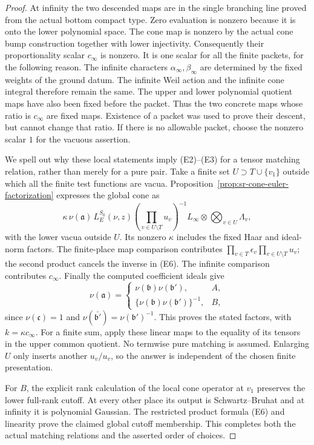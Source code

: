 \begin{proof}
At infinity the two descended maps are in the single branching
line proved from the actual bottom compact type.
Zero evaluation is nonzero because it is onto the lower
polynomial space. The cone map is nonzero by the actual
cone bump construction together with lower injectivity.
Consequently their proportionality scalar \(c_\infty\)
is nonzero. It is one scalar for all the finite packets,
for the following reason. The infinite characters
\(\alpha_\infty,\beta_\infty\) are determined by the fixed
weights of the ground datum. The infinite Weil action and
the infinite cone integral therefore remain the same.
The upper and lower polynomial quotient maps have also
been fixed before the packet. Thus the two concrete maps
whose ratio is \(c_\infty\) are fixed maps. Existence of a
packet was used to prove their descent, but cannot change
that ratio. If there is no allowable packet, choose the
nonzero scalar \(1\) for the vacuous assertion.

We spell out why these local statements imply (E2)--(E3)
for a tensor matching relation, rather than merely for a
pure pair. Take a finite set \(U\supset T\cup\{v_1\}\)
outside which all the finite test functions are vacua.
Proposition~\ref{prop:sr-cone-euler-factorization} expresses
the global cone as
\[
 \kappa\,\nu(\mathfrak a)\,L^{S_0}_E(\nu,z)
       \left(\prod_{v\in U\setminus T}u_v\right)^{-1}
       L_\infty\otimes\bigotimes_{v\in U}\Lambda_v,
 \tag{E6}\label{eq:sr-theta-endgame-tensor-cone}
\]
with the lower vacua outside \(U\).
Its nonzero \(\kappa\) includes the fixed Haar and ideal-norm
factors. The finite-place map comparison contributes
\(\prod_{v\in T}\epsilon_v\prod_{v\in U\setminus T}u_v\);
the second product cancels the inverse in (E6).
The infinite comparison contributes \(c_\infty\).
Finally the computed coefficient ideals give
\[
 \nu(\mathfrak a)=
 \begin{cases}
   \nu(\mathfrak b)\nu(\mathfrak b'),&A,\\
   \{\nu(\mathfrak b)\nu(\mathfrak b')\}^{-1},&B,
 \end{cases}
\]
since \(\nu(\mathfrak c)=1\) and
\(\nu(\bar{\mathfrak b'})=\nu(\mathfrak b')^{-1}\).
This proves the stated factors, with \(k=\kappa c_\infty\).
For a finite sum, apply these linear maps to the equality
of its tensors in the upper common quotient.
No termwise pure matching is assumed. Enlarging \(U\)
only inserts another \(u_v/u_v\), so the answer is independent
of the chosen finite presentation.

For \(B\), the explicit rank calculation of the local cone
operator at \(v_1\) preserves the lower full-rank cutoff.
At every other place its output is Schwartz--Bruhat and at
infinity it is polynomial Gaussian. The restricted product
formula (E6) and linearity prove the claimed global cutoff
membership. This completes both the actual matching
relations and the asserted order of choices.
\end{proof}

